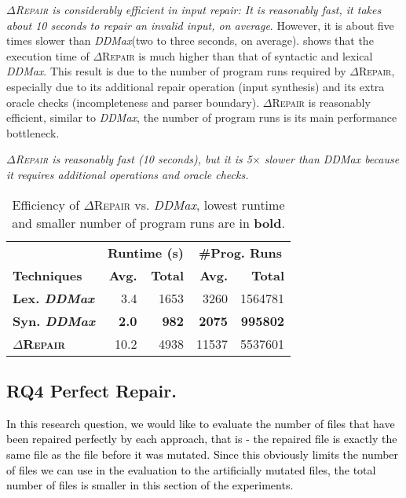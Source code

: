 \documentclass[acmsmall,screen,review,anonymous]{acmart}
\newenvironment{result}{\begin{framed}\centering\it}{\end{framed}}
\newcommand{\revise}[1]{\textcolor{black}{#1}}
\newcommand{\approach}{\textsc{$\Delta$Repair}\xspace}
\newcommand{\ddmax}{\textit{DDMax}\xspace}
\begin{document}
\textit{\approach is considerably efficient in input repair: It is reasonably fast, it takes about 10 seconds to repair an invalid input, on average}. However, it is about five times slower than \ddmax (two to three seconds, on average). 
shows %
that the execution time
of \approach %
is much higher %
than that of syntactic and lexical \ddmax. 
This result is %
due to the %
number of program runs required by \approach, especially due to its additional repair operation (input synthesis) and its extra oracle checks (incompleteness and parser boundary).
\approach is reasonably efficient, similar to \ddmax, the number of program runs 
is its main performance bottleneck. %

\begin{result}
\approach is reasonably fast (10 seconds), but it 
is 5$\times$ slower than \ddmax because it requires
additional operations and oracle checks. 
\end{result}

\begin{table}[!tbp]\centering
\caption{Efficiency of \approach vs. \ddmax, lowest runtime and smaller number of program runs %
are in \textbf{bold}. %
}
\begin{tabular}{|l |  r  r | r  r |}
\hline
&  \multicolumn{2}{c|}{\textbf{Runtime (s)}} & \multicolumn{2}{c|}{\textbf{\#Prog. Runs}}  \\
\textbf{Techniques} %
&  \textbf{Avg.}  & \textbf{Total} & \textbf{Avg.}  & \textbf{Total} \\
\hline
\textbf{Lex. \ddmax} & 3.4 & 1653 & 3260 & 1564781 \\
\textbf{Syn. \ddmax} & \textbf{2.0} & \textbf{982}  & \textbf{2075}  & \textbf{995802}  \\
\hline
\textbf{\approach} &  10.2 & 4938  & 11537 & 5537601  \\
\hline
\end{tabular}
\label{tab:efficiency}
\end{table}

\subsection{RQ4 Perfect Repair.}
\revise{In this research question, we would like to evaluate the number of files that have been repaired perfectly by each approach, that is - the repaired file is exactly the same file as the file before it was mutated.
Since this obviously limits the number of files we can use in the evaluation to the artificially mutated files, the total number of files is smaller in this section of the experiments.}
\end{document}
